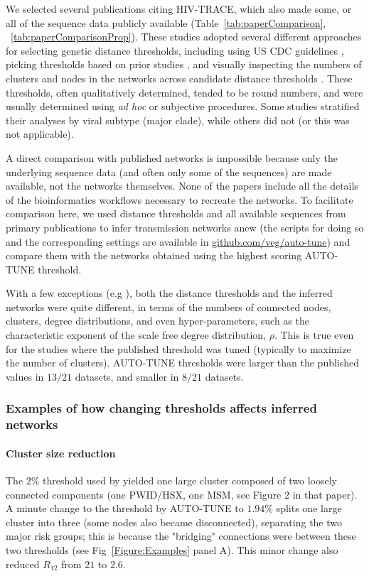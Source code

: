 \documentclass[utf8]{FrontiersinHarvard} %
\begin{document}
We selected several publications citing HIV-TRACE, which also made some, or all
of the sequence data publicly available (Table~\ref{tab:paperComparison},
~\ref{tab:paperComparisonProp}). These studies adopted several different
approaches for selecting genetic distance thresholds, including using US CDC
guidelines \citep{yan_central_2020}, picking thresholds based on prior studies
\citep{sivay_hiv-1_2018}, and visually inspecting the numbers of clusters and
nodes in the networks across candidate distance thresholds
\citep{liu_dynamics_2020}. These thresholds, often qualitatively determined,
tended to be round numbers, and were usually determined using {\it ad hoc} or
subjective procedures. Some studies stratified their analyses by viral subtype
(major clade), while others did not (or this was not applicable).

A direct comparison with published networks is impossible because only the
underlying sequence data (and often only some of the sequences) are made
available, not the networks themselves. None of the papers include all the
details of the bioinformatics workflows necessary to recreate the networks. To
facilitate comparison here, we used distance thresholds and all available
sequences from primary publications to infer transmission networks anew (the
scripts for doing so and the corresponding settings are available in
\url{github.com/veg/auto-tune}) and compare them with the networks obtained
using the highest scoring AUTO-TUNE threshold.

With a few exceptions (e.g \cite{dalai_combining_2018,sivay_hiv-1_2018}), both
the distance thresholds and the inferred networks were quite different, in
terms of the numbers of connected nodes, clusters, degree distributions, and
even hyper-parameters, such as the characteristic exponent of the scale free
degree distribution, $\rho$. This is true even for the studies where the
published threshold was tuned (typically to maximize the number of clusters).
AUTO-TUNE thresholds were larger than the published values in $13/21$ datasets,
and smaller in $8/21$ datasets. 

\subsubsection{Examples of how changing thresholds affects inferred networks}

\paragraph{Cluster size reduction} The $2\%$ threshold used by
\citet{dalai_combining_2018} yielded one large cluster composed of two loosely
connected components (one PWID/HSX, one MSM, see Figure 2 in that paper). A
minute change to the threshold by AUTO-TUNE to $1.94\%$ splits one large
cluster into three (some nodes also became disconnected), separating the two
major risk groups; this is because the "bridging" connections were between
these two thresholds (see Fig~\ref{Figure:Examples} panel A). This minor change
also reduced $R_{12}$ from $21$ to $2.6$.
\end{document}
